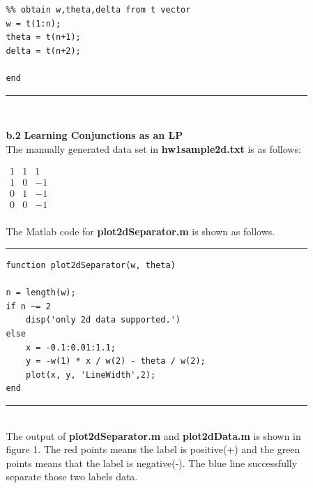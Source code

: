 \begin{enumerate}
\begin{enumerate}
\begin{enumerate}
\begin{lstlisting}
%% obtain w,theta,delta from t vector
w = t(1:n);
theta = t(n+1);
delta = t(n+2);

end
\end{lstlisting}
\rule{400pt}{2pt}\\

\item[{\bf b.2 }] {\bf Learning Conjunctions as an LP}\\

The manually generated data set in {\bf hw1sample2d.txt} is as follows:\\
\begin{center}
$\begin{matrix}
1 & 1 &  1 \\ 1 & 0 & -1 \\ 0 & 1 & -1 \\ 0 & 0 & -1\\
\end{matrix}$\\
\end{center}


The Matlab code for {\bf plot2dSeparator.m} is shown as follows.\\

\rule{400pt}{2pt}
\begin{lstlisting}
function plot2dSeparator(w, theta)

n = length(w);
if n ~= 2
    disp('only 2d data supported.')
else
    x = -0.1:0.01:1.1;
    y = -w(1) * x / w(2) - theta / w(2);
    plot(x, y, 'LineWidth',2);
end

\end{lstlisting}
\rule{400pt}{2pt}\\

The output of {\bf plot2dSeparator.m} and {\bf plot2dData.m} is shown in figure 1. The red points means the label is positive(+) and the green points means that the label is negative(-). The blue line successfully separate those two labels data.\\


\end{enumerate}
\end{enumerate}
\end{enumerate}
